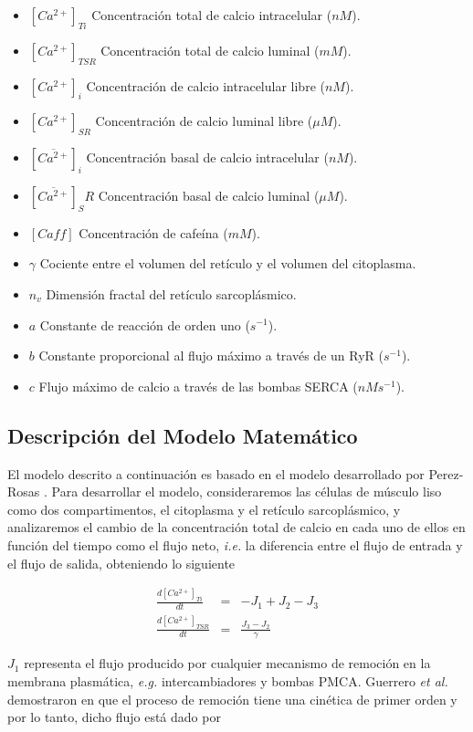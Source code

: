 \documentclass[draft]{article}
\newcommand{\Cai}{[Ca^{2+}]_{i}}
\newcommand{\Cal}{[Ca^{2+}]_{SR}}
\newcommand{\al}{\textit{et al.} }
\newcommand{\ie}{\textit{i.e.} }
\newcommand{\eg}{\textit{e.g.} }
\begin{document}
\begin{itemize}
	\item $[Ca^{2+}]_{Ti}$ Concentración total de calcio intracelular ($nM$).
	\item $[Ca^{2+}]_{TSR}$ Concentración total de calcio luminal ($mM$).
	\item $\Cai$ Concentración de calcio intracelular libre ($nM$).
	\item $\Cal$ Concentración de calcio luminal libre ($\mu M$).
	\item $[\overline{Ca^{2+}}]_i$ Concentración basal de calcio intracelular ($nM$).
	\item $[\overline{Ca^{2+}}]_SR$ Concentración basal de calcio luminal ($\mu M$).
	\item $[Caff]$ Concentración de cafeína ($mM$).
	\item $\gamma$ Cociente entre el volumen del retículo y el volumen del citoplasma.
	\item $n_v$ Dimensión fractal del retículo sarcoplásmico.
	\item $a$ Constante de reacción de orden uno ($s^{-1}$).
	\item $b$ Constante proporcional al flujo máximo a través de un RyR ($s^{-1}$).
	\item $c$ Flujo máximo de calcio a través de las bombas SERCA ($nMs^{-1}$).
	
	
\end{itemize}

\subsection{Descripción del Modelo Matemático}

El modelo descrito a continuación es basado en el modelo desarrollado por Perez-Rosas \cite{Perez-Rosas2016}. Para desarrollar el modelo, consideraremos las células de músculo liso como dos compartimentos, el citoplasma y el retículo sarcoplásmico, y analizaremos el cambio de la concentración total de calcio en cada uno de ellos en función del tiempo como el flujo neto, \ie la diferencia entre el flujo de entrada y el flujo de salida, obteniendo lo siguiente

\begin{eqnarray}
\frac{d[Ca^{2+}]_{Ti}}{dt} & = & -J_{1}+J_{2}-J_{3}  \nonumber \\
\frac{d[Ca^{2+}]_{TSR}}{dt} & = & \frac{J_{3}-J_{2}}{\gamma}
\end{eqnarray}

$J_{1}$ representa el flujo producido por cualquier mecanismo de remoción en la membrana plasmática, \eg intercambiadores y bombas PMCA. Guerrero \al demostraron en \cite{Guerrero1994} que el proceso de remoción tiene una cinética de primer orden y por lo tanto, dicho flujo está dado por
\end{document}
